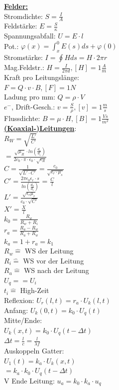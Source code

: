 \documentclass[11pt]{article}
\begin{document}
\begin{minipage}{0.33\textwidth}

\underline{\textbf{Felder:}}\\
Stromdichte: $S=\frac{I}{A}$\\
Feldstärke: $E=\frac{S}{\kappa}$\\
Spannungsabfall: $U=E \cdot l$\\
Pot.: $\varphi (x)= \int_x^0 E(s)ds + \varphi(0)$\\
Stromstärke: $I = \oint H ds = H \cdot 2\pi r$\\
Mag.Feldstr.: $H = \frac{I}{2\pi d}, [H] = 1\frac{A}{m}$\\
Kraft pro Leitungslänge:\\
\phantom{ss} $F=Q \cdot v \cdot B, [F] = 1N$\\
Ladung pro mm: $Q = \rho \cdot V$\\
$e^-$, Drift-Gesch.: $v = \frac{S}{\rho}, [v] = 1\frac{m}{s}$\\
Flussdichte: $B=\mu \cdot H, [B] = 1 \frac{Vs}{m^2}$\\
 
 \underline{\textbf{(Koaxial-)Leitungen}}:\\
$R_W = \sqrt{\frac{L'}{C'}}$\\
    \phantom{sssi} $=\frac{\sqrt{\mu_R} \cdot ln(\frac{d_a}{d_i})}{2c_0 \cdot \pi \cdot \epsilon_0 \cdot \sqrt{\epsilon_R}}$\\
$C = \frac{1}{\sqrt{L' \cdot C'}} = \frac{c_0}{\sqrt{\epsilon_r \cdot \mu_s}}$\\
$C' = \frac{2\pi \epsilon_0 \epsilon_r \cdot s}{ln(\frac{d_a}{d_i})}$ = $\frac{C}{l}$\\
$L' = \frac{\sqrt{\epsilon_r \mu_r}}{c_0 \cdot \sqrt{C'}}$\\
$X' = \frac{X}{l}$\\

$k_0 = \frac{R_w}{R_w + R_i} $\\
$r_a = \frac{R_a - R_w}{R_a + R_w} $\\
$k_a = 1 + r_a = k_1$\\
$R_w \hat{=}$ WS der Leitung\\
$R_i \hat{=}$ WS vor der Leitung\\
$R_a \hat{=}$ WS nach der Leitung\\
$U_q == U_i$\\
$t_i \hat{=}$ High-Zeit\\
Reflexion: $U_r(l,t) = r_a \cdot U_k(l,t)$\\
Anfang: $U_k(0,t)=k_0 \cdot U_{q}(t)$\\
Mitte/Ende:\\
\phantom{ss} $U_k(x,t)= k_0 \cdot U_{q}(t-\Delta t)$\\
\phantom{sss}$\Delta t = \frac{l}{c} = \frac{l}{\lambda f}$\\
Auskoppeln Gatter:\\
\phantom{ss} $U_1(t) = k_a \cdot U_k(x,t) $\\
\phantom{sssssssiiii}$= k_a\cdot k_0 \cdot U_q(t-\Delta t)$\\
V Ende Leitung: $u_a = k_0 \cdot k_a \cdot u_q$\\


\end{minipage}
\end{document}
